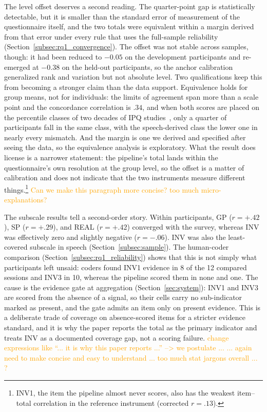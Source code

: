 The level offset deserves a second reading. The quarter-point gap is statistically detectable, but it is smaller than the standard error of measurement of the questionnaire itself, and the two totals were equivalent within a margin derived from that error under every rule that uses the full-sample reliability (Section~\ref{subsec:rq1_convergence}). The offset was not stable across samples, though: it had been reduced to $-0.05$ on the development participants and re-emerged at $-0.38$ on the held-out participants, so the anchor calibration generalized rank and variation but not absolute level. Two qualifications keep this from becoming a stronger claim than the data support. Equivalence holds for group means, not for individuals: the limits of agreement span more than a scale point and the concordance correlation is $.34$, and when both scores are placed on the percentile classes of two decades of IPQ studies~\cite{tran2024ipq}, only a quarter of participants fall in the same class, with the speech-derived class the lower one in nearly every mismatch. And the margin is one we derived and specified after seeing the data, so the equivalence analysis is exploratory. What the result does license is a narrower statement: the pipeline's total lands within the questionnaire's own resolution at the group level, so the offset is a matter of calibration and does not indicate that the two instruments measure different things.\footnote{INV1, the item the pipeline almost never scores, also has the weakest item--total correlation in the reference instrument (corrected $r=.13$).}
\textcolor{orange}{Can we make this paragraph more concise? too much micro-explanations? }

The subscale results tell a second-order story. Within participants, GP ($r=+.42$), SP ($r=+.29$), and REAL ($r=+.42$) converged with the survey, whereas INV was effectively zero and slightly negative ($r=-.06$). INV was also the least-covered subscale in speech (Section~\ref{subsec:sample}). The human-coder comparison (Section~\ref{subsec:rq1_reliability}) shows that this is not simply what participants left unsaid: coders found INV1 evidence in 8 of the 12 compared sessions and INV3 in 10, whereas the pipeline scored them in none and one. The cause is the evidence gate at aggregation (Section~\ref{sec:system}): INV1 and INV3 are scored from the absence of a signal, so their cells carry no sub-indicator marked as present, and the gate admits an item only on present evidence. This is a deliberate trade of coverage on absence-scored items for a stricter evidence standard, and it is why the paper reports the total as the primary indicator and treats INV as a documented coverage gap, not a scoring failure.
\textcolor{orange}{
change expressions like ``... it is why this paper reports ...'' --> we postulate ... 
... again need to make concise and easy to understand ... too much stat jargons overall ...
? }

